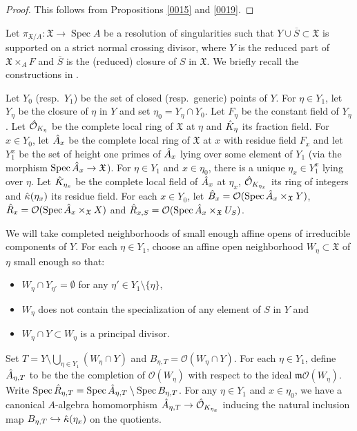 \documentclass{amsart}
\theoremstyle{remark}
\numberwithin{equation}{section}
\newcommand{\Order}{\mathcal{O}}
\newcommand{\into}{\hookrightarrow}
\newcommand{\closure}[1]{\overline{#1}}
\newcommand{\ideal}[1]{\mathfrak{#1}}
\DeclareMathOperator{\Spec}{Spec}
\begin{document}
\begin{proof}
	This follows from Propositions \ref{0015} and \ref{0019}.
\end{proof}

Let $\pi_{\mathfrak{X} / A} \colon \mathfrak{X} \to \Spec A$ be a resolution of singularities
such that $Y \cup \closure{S} \subset \mathfrak{X}$ is
supported on a strict normal crossing divisor,
where $Y$ is the reduced part of $\mathfrak{X} \times_{A} F$
and $\closure{S}$ is the (reduced) closure of $S$ in $\mathfrak{X}$.
We briefly recall the constructions in \cite[Sections 10.4 and 10.5]{Suz24}.

Let $Y_{0}$ (resp.\ $Y_{1}$) be the set of closed (resp.\ generic) points of $Y$.
For $\eta \in Y_{1}$, let $Y_{\eta}$ be the closure of $\eta$ in $Y$
and set $\eta_{0} = Y_{\eta} \cap Y_{0}$.
Let $F_{\eta}$ be the constant field of $Y_{\eta}$.
Let $\Hat{\Order}_{K_{\eta}}$ be the complete local ring of $\mathfrak{X}$ at $\eta$
and $\Hat{K}_{\eta}$ its fraction field.
For $x \in Y_{0}$, let $\Hat{A}_{x}$ be the complete local ring of $\mathfrak{X}$ at $x$
with residue field $F_{x}$
and let $Y_{1}^{x}$ be the set of height one primes of $\Hat{A}_{x}$
lying over some element of $Y_{1}$ (via the morphism $\Spec \Hat{A}_{x} \to \mathfrak{X}$).
For $\eta \in Y_{1}$ and $x \in \eta_{0}$,
there is a unique $\eta_{x} \in Y_{1}^{x}$ lying over $\eta$.
Let $\Hat{K}_{\eta_{x}}$ be the complete local field of $\Hat{A}_{x}$ at $\eta_{x}$,
$\Hat{\Order}_{K_{\eta_{x}}}$ its ring of integers
and $\Hat{\kappa}(\eta_{x})$ its residue field.
For each $x \in Y_{0}$,
let $\Hat{B}_{x} = \Order(\Spec \Hat{A}_{x} \times_{\mathfrak{X}} Y)$,
$\Hat{R}_{x} = \Order(\Spec \Hat{A}_{x} \times_{\mathfrak{X}} X)$
and $\Hat{R}_{x, S} = \Order(\Spec \Hat{A}_{x} \times_{\mathfrak{X}} U_{S})$.

We will take completed neighborhoods of small enough affine opens
of irreducible components of $Y$.
For each $\eta \in Y_{1}$,
choose an affine open neighborhood $W_{\eta} \subset \mathfrak{X}$ of $\eta$
small enough so that:
\begin{itemize}
	\item \label{0094}
		$W_{\eta} \cap Y_{\eta'} = \emptyset$
		for any $\eta' \in Y_{1} \setminus \{\eta\}$,
	\item \label{0095}
		$W_{\eta}$ does not contain the specialization of any element of $S$ in $Y$ and
	\item \label{0096}
		$W_{\eta} \cap Y \subset W_{\eta}$ is a principal divisor.
\end{itemize}
Set $T = Y \setminus \bigcup_{\eta \in Y_{1}} (W_{\eta} \cap Y)$
and $B_{\eta, T} = \Order(W_{\eta} \cap Y)$.
For each $\eta \in Y_{1}$,
define $\Hat{A}_{\eta, T}$ to be the the completion of
$\Order(W_{\eta})$ with respect to the ideal $\ideal{m} \Order(W_{\eta})$.
Write $\Spec \Hat{R}_{\eta, T} = \Spec \Hat{A}_{\eta, T} \setminus \Spec B_{\eta, T}$.
For any $\eta \in Y_{1}$ and $x \in \eta_{0}$,
we have a canonical $A$-algebra homomorphism
$\Hat{A}_{\eta, T} \to \Hat{\Order}_{K_{\eta_{x}}}$
inducing the natural inclusion map
$B_{\eta, T} \into \Hat{\kappa}(\eta_{x})$ on the quotients.
\end{document}
